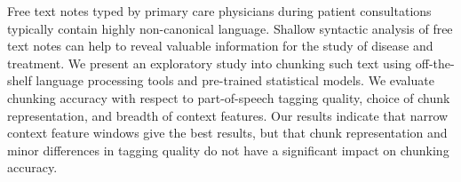 Free text notes typed by primary care physicians during patient consultations typically contain highly non-canonical language. Shallow syntactic analysis of free text notes can help to reveal valuable information for the study of disease and treatment. We present an exploratory study into chunking such text using off-the-shelf language processing tools and pre-trained statistical models. We evaluate chunking accuracy with respect to part-of-speech tagging quality, choice of chunk representation, and breadth of context features. Our results indicate that narrow context feature windows give the best results, but that chunk representation and minor differences in tagging quality do not have a significant impact on chunking accuracy.
